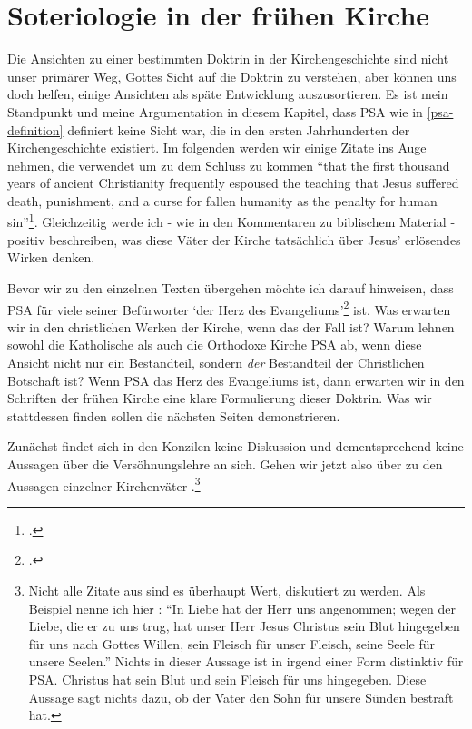 \chapter{\label{chap:early-church}Soteriologie in der frühen Kirche}
Die Ansichten zu einer bestimmten Doktrin in der Kirchengeschichte sind nicht unser primärer Weg,
Gottes Sicht auf die Doktrin zu verstehen, aber können uns doch helfen, einige Ansichten als späte Entwicklung auszusortieren.
Es ist mein Standpunkt und meine Argumentation in diesem Kapitel, dass PSA wie in \ref{psa-definition} definiert keine Sicht war, die in den ersten Jahrhunderten der Kirchengeschichte existiert.
Im folgenden werden wir einige Zitate ins Auge nehmen, die \Cite{psa-in-church-history}
verwendet um zu dem Schluss zu kommen ``that the first thousand years of ancient Christianity frequently espoused the teaching that Jesus suffered death, punishment, and a curse for fallen humanity as the penalty for human sin''\Footcite[199, Abstract]{psa-in-church-history}.
Gleichzeitig werde ich - wie in den Kommentaren zu biblischem Material - positiv beschreiben, was diese Väter der Kirche tatsächlich über Jesus' erlösendes Wirken denken.

Bevor wir zu den einzelnen Texten übergehen möchte ich darauf hinweisen, dass PSA für viele seiner Befürworter `der Herz des Evangeliums'\Footcite{psa-is-the-heart-of-the-gospel} ist.
Was erwarten wir in den christlichen Werken der Kirche, wenn das der Fall ist?
Warum lehnen sowohl die Katholische als auch die Orthodoxe Kirche PSA ab, wenn diese Ansicht nicht nur ein Bestandteil, sondern \textit{der} Bestandteil der Christlichen Botschaft ist?
Wenn PSA das Herz des Evangeliums ist, dann erwarten wir in den Schriften der frühen Kirche eine klare Formulierung dieser Doktrin.
Was wir stattdessen finden sollen die nächsten Seiten demonstrieren.

Zunächst findet sich in den Konzilen keine Diskussion und dementsprechend keine Aussagen über die Versöhnungslehre an sich. Gehen wir jetzt also über zu den Aussagen einzelner Kirchenväter
.\footnote{Nicht alle Zitate aus \Cite{psa-in-church-history} sind es überhaupt Wert, diskutiert zu werden.
Als Beispiel nenne ich hier \Cite[49:6]{clement-epistula-ad-corinthios}: ``In Liebe hat der Herr uns angenommen; wegen der Liebe, die er zu uns trug, hat unser Herr Jesus Christus sein Blut hingegeben für uns nach Gottes Willen, sein Fleisch für unser Fleisch, seine Seele für unsere Seelen.''
Nichts in dieser Aussage ist in irgend einer Form distinktiv für PSA.
Christus hat sein Blut und sein Fleisch für uns hingegeben.
Diese Aussage sagt nichts dazu, ob der Vater den Sohn für unsere Sünden bestraft hat.}

